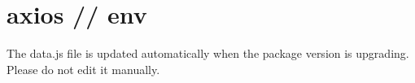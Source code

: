 \chapter{axios // env}
\hypertarget{md_pkiclassroomrescheduler_2src_2main_2frontend_2node__modules_2axios_2lib_2env_2_r_e_a_d_m_e}{}\label{md_pkiclassroomrescheduler_2src_2main_2frontend_2node__modules_2axios_2lib_2env_2_r_e_a_d_m_e}
\label{md_pkiclassroomrescheduler_2src_2main_2frontend_2node__modules_2axios_2lib_2env_2_r_e_a_d_m_e_autotoc_md5606}%
%
 The {\ttfamily data.\+js} file is updated automatically when the package version is upgrading. Please do not edit it manually. 